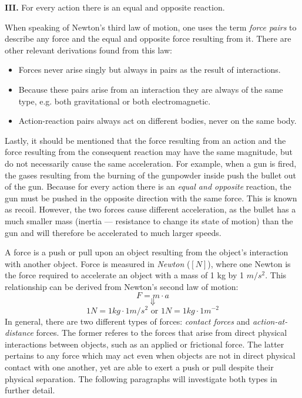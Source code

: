 \begin{displayquote}
	\textbf{III.} For every action there is an equal and opposite reaction.
\end{displayquote}

When speaking of Newton's third law of motion, one uses the term \emph{force pairs} to describe any force and the equal and opposite force resulting from it. There are other relevant derivations found from this law:

\begin{itemize}
	\item Forces never arise singly but always in pairs as the result of interactions.
	\item Because these pairs arise from an interaction they are always of the same type, e.g. both gravitational or both electromagnetic.
	\item Action-reaction pairs always act on different bodies, never on the same body.
\end{itemize}

Lastly, it should be mentioned that the force resulting from an action and the force resulting from the consequent reaction may have the same magnitude, but do not necessarily cause the same acceleration. For example, when a gun is fired, the gases resulting from the burning of the gunpowder inside push the bullet out of the gun. Because for every action there is an \emph{equal and opposite} reaction, the gun must be pushed in the opposite direction with the same force. This is known as recoil. However, the two forces cause different acceleration, as the bullet has a much smaller mass (inertia --- resistance to change its state of motion) than the gun and will therefore be accelerated to much larger speeds.


A force is a push or pull upon an object resulting from the object’s interaction with another object. Force is measured in \emph{Newton} ($[N]$), where one Newton is the force required to accelerate an object with a mass of 1 kg by 1 $m/s^2$. This relationship can be derived from Newton's second law of motion: $$F = m \cdot a$$ $$\Downarrow$$ $$ 1 N = 1 kg \cdot 1 m/s^2 \text{ or } 1 N = 1 kg \cdot 1 m^{-2}$$ In general, there are two different types of forces: \emph{contact forces} and \emph{action-at-distance} forces. The former referes to the forces that arise from direct physical interactions between objects, such as an applied or frictional force. The latter pertains to any force which may act even when objects are not in direct physical contact with one another, yet are able to exert a push or pull despite their physical separation. The following paragraphs will investigate both types in further detail.

